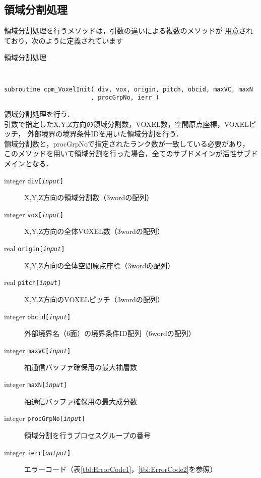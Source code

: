 \subsection{領域分割処理}
\label{voxelInitF}
領域分割処理を行うメソッドは，引数の違いによる複数のメソッドが
用意されており，次のように定義されています\\

\begin{spacing}{0.8}
\begin{itembox}[l]{領域分割処理}
{\tt
\begin{verbatim}
subroutine cpm_VoxelInit( div, vox, origin, pitch, obcid, maxVC, maxN
                        , procGrpNo, ierr )
\end{verbatim}
}
領域分割処理を行う．\\
引数で指定したX,Y,Z方向の領域分割数，VOXEL数，空間原点座標，VOXELピッチ，
外部境界の境界条件IDを用いた領域分割を行う．\\
領域分割数と，procGrpNoで指定されたランク数が一致している必要があり，
このメソッドを用いて領域分割を行った場合，全てのサブドメインが活性サブドメインとなる．
\begin{description}
\item[integer {\tt div[{\it input}]}] X,Y,Z方向の領域分割数（3wordの配列）
\item[integer {\tt vox[{\it input}]}] X,Y,Z方向の全体VOXEL数（3wordの配列）
\item[real    {\tt origin[{\it input}]}] X,Y,Z方向の全体空間原点座標（3wordの配列）
\item[real    {\tt pitch[{\it input}]}] X,Y,Z方向のVOXELピッチ（3wordの配列）
\item[integer {\tt obcid[{\it input}]}] 外部境界名（6面）の境界条件ID配列（6wordの配列）
\item[integer {\tt maxVC[{\it input}]}] 袖通信バッファ確保用の最大袖層数
\item[integer {\tt maxN[{\it input}]}] 袖通信バッファ確保用の最大成分数
\item[integer {\tt procGrpNo[{\it input}]}] 領域分割を行うプロセスグループの番号
\item[integer {\tt ierr[{\it output}]}] エラーコード（表\ref{tbl:ErrorCode1}，\ref{tbl:ErrorCode2}を参照）
\end{description}
\end{itembox}\\
\end{spacing}

